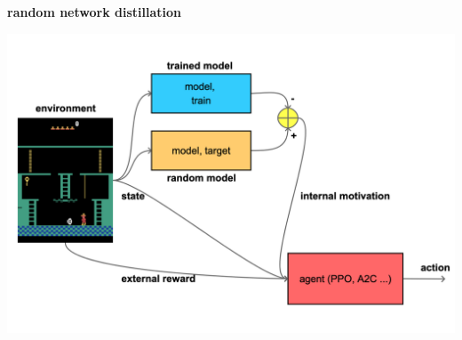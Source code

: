 \documentclass[xcolor=dvipsnames]{beamer}
\begin{document}
\begin{frame}{\bf random network distillation}

\centering
\includegraphics[scale=0.15]{../diagrams/rnd/rnd.png}

\end{frame}
\end{document}
